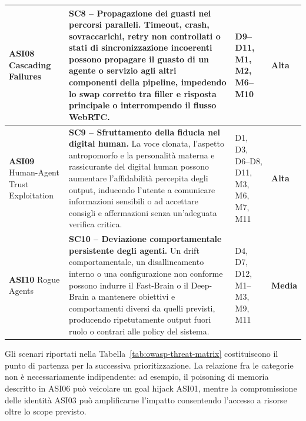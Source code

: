\documentclass[11pt,a4paper]{article}
\newcommand{\appAlta}{\cellcolor{RiskHigh}\textbf{Alta}}
\newcommand{\appMedia}{\cellcolor{RiskMedium}\textbf{Media}}
\begin{document}
\begin{longtable}{
    |C{2.05cm}|
    L{\dimexpr\textwidth-2.05cm-2.20cm-2.25cm-8\arrayrulewidth\relax}|
    C{2.20cm}|
    C{2.25cm}|
}
\textbf{ASI08} \newline Cascading Failures
&
\textbf{SC8 -- Propagazione dei guasti nei percorsi paralleli.}
Timeout, crash, sovraccarichi, retry non controllati o stati di
sincronizzazione incoerenti possono propagare il guasto di un agente o
servizio agli altri componenti della pipeline, impedendo lo swap
corretto tra filler e risposta principale o interrompendo il flusso
WebRTC.
&
D9--D11, M1, M2, M6--M10
&
\appAlta
\\
\hline


\textbf{ASI09} \newline Human-Agent Trust Exploitation
&
\textbf{SC9 -- Sfruttamento della fiducia nel digital human.}
La voce clonata, l'aspetto antropomorfo e la personalità materna e
rassicurante del digital human possono aumentare l'affidabilità
percepita degli output, inducendo l'utente a comunicare informazioni
sensibili o ad accettare consigli e affermazioni senza un'adeguata
verifica critica.
&
D1, D3, D6--D8, D11, M3, M6, M7, M11
&
\appAlta
\\
\hline


\textbf{ASI10} \newline Rogue Agents
&
\textbf{SC10 -- Deviazione comportamentale persistente degli agenti.}
Un drift comportamentale, un disallineamento interno o una
configurazione non conforme possono indurre il Fast-Brain o il
Deep-Brain a mantenere obiettivi e comportamenti diversi da quelli
previsti, producendo ripetutamente output fuori ruolo o contrari alle
policy del sistema.
&
D4, D7, D12, M1--M3, M9, M11
&
\appMedia
\\
\hline

\end{longtable}
\endgroup

Gli scenari riportati nella
Tabella~\ref{tab:owasp-threat-matrix} costituiscono il punto di partenza
per la successiva prioritizzazione. La relazione fra le categorie non
è necessariamente indipendente: ad esempio, il poisoning di memoria
descritto in ASI06 può veicolare un goal hijack ASI01, mentre la
compromissione delle identità ASI03 può amplificarne l'impatto
consentendo l'accesso a risorse oltre lo scope previsto.

\end{document}
